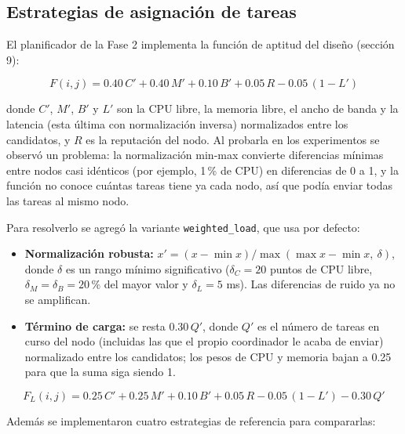 \documentclass{article}
\begin{document}
\subsection{Estrategias de asignación de tareas}

El planificador de la Fase 2 implementa la función de aptitud del diseño (sección 9):

\begin{equation}
F(i,j) = 0.40\,C' + 0.40\,M' + 0.10\,B' + 0.05\,R - 0.05\,(1 - L')
\end{equation}

donde $C'$, $M'$, $B'$ y $L'$ son la CPU libre, la memoria libre, el ancho de banda y la latencia
(esta última con normalización inversa) normalizados entre los candidatos, y $R$ es la reputación del
nodo. Al probarla en los experimentos se observó un problema: la normalización min-max convierte
diferencias mínimas entre nodos casi idénticos (por ejemplo, 1\,\% de CPU) en diferencias de 0 a 1, y
la función no conoce cuántas tareas tiene ya cada nodo, así que podía enviar todas las tareas al mismo
nodo.

Para resolverlo se agregó la variante \texttt{weighted\_load}, que usa por defecto:

\begin{itemize}
\item \textbf{Normalización robusta:} $x' = (x - \min x) / \max(\max x - \min x,\ \delta)$, donde
$\delta$ es un rango mínimo significativo ($\delta_C = 20$ puntos de CPU libre, $\delta_M = \delta_B = 20\,\%$
del mayor valor y $\delta_L = 5$ ms). Las diferencias de ruido ya no se amplifican.
\item \textbf{Término de carga:} se resta $0.30\,Q'$, donde $Q'$ es el número de tareas en curso del
nodo (incluidas las que el propio coordinador le acaba de enviar) normalizado entre los candidatos; los
pesos de CPU y memoria bajan a 0.25 para que la suma siga siendo 1.
\end{itemize}

\begin{equation}
F_{L}(i,j) = 0.25\,C' + 0.25\,M' + 0.10\,B' + 0.05\,R - 0.05\,(1 - L') - 0.30\,Q'
\end{equation}

Además se implementaron cuatro estrategias de referencia para compararlas:
\end{document}
